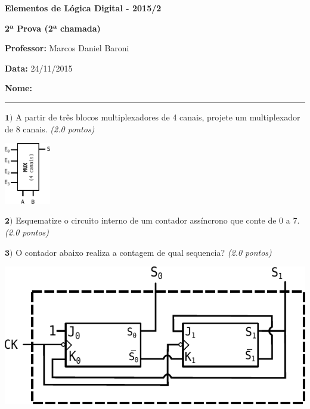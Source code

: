 \documentclass[12pt]{article}
\newcommand{\exerc}[3]{ \vspace*{25pt} {$\mathbf{#1)}$} #2 \hfill {\it #3} }
\begin{document}

\begin{center}
{\Large \bf Elementos de Lógica Digital - 2015/2}
\end{center}
\vspace{2pt}

{\large \bf 2ª Prova (2ª chamada)}

{\bf Professor:} Marcos Daniel Baroni

{\bf Data:} 24/11/2015

\vspace{2pt}
{\bf Nome:} \rule[-2mm]{130mm}{1pt}

\exerc{1}{A partir de três blocos multiplexadores de 4 canais, projete um
  multiplexador de 8 canais.}{(2.0 pontos)}
  \begin{center}
		  \includegraphics[width=20mm]{mux4}
  \end{center}

\vspace{-10pt}
\exerc{2}{Esquematize o circuito interno de um contador assíncrono que conte de 0 a 7.}{(2.0 pontos)}

\exerc{3}{O contador abaixo realiza a contagem de qual sequencia?}{(2.0 pontos)}
\begin{center}
  \includegraphics[scale=0.6]{cont1} \\ \vspace{15pt}
\end{center}
\end{document}
